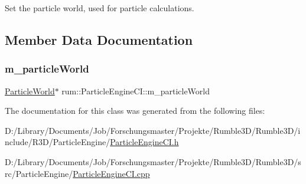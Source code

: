 Set the particle world, used for particle calculations. 

\subsection{Member Data Documentation}
\mbox{\label{classrum_1_1_particle_engine_c_i_a99948cbb49d93cde3140b29b4360e01f}} 
\subsubsection{\texorpdfstring{m\+\_\+particle\+World}{m\_particleWorld}}
{\footnotesize\ttfamily \mbox{\hyperlink{classrum_1_1_particle_world}{Particle\+World}}$\ast$ rum\+::\+Particle\+Engine\+C\+I\+::m\+\_\+particle\+World\hspace{0.3cm}{\ttfamily [protected]}}



The documentation for this class was generated from the following files\+:\begin{DoxyCompactItemize}
\item 
D\+:/\+Library/\+Documents/\+Job/\+Forschungsmaster/\+Projekte/\+Rumble3\+D/\+Rumble3\+D/include/\+R3\+D/\+Particle\+Engine/\mbox{\hyperlink{_particle_engine_c_i_8h}{Particle\+Engine\+C\+I.\+h}}\item 
D\+:/\+Library/\+Documents/\+Job/\+Forschungsmaster/\+Projekte/\+Rumble3\+D/\+Rumble3\+D/src/\+Particle\+Engine/\mbox{\hyperlink{_particle_engine_c_i_8cpp}{Particle\+Engine\+C\+I.\+cpp}}\end{DoxyCompactItemize}
